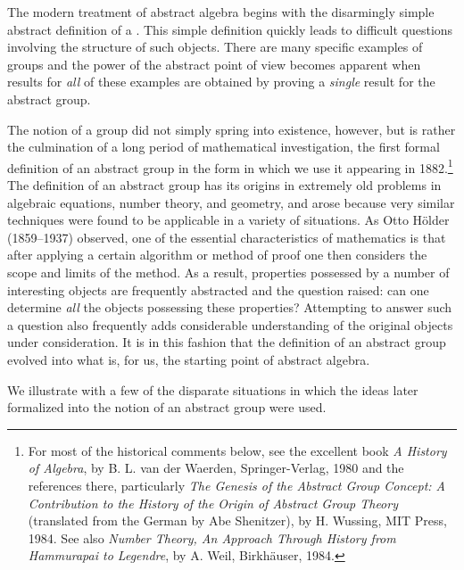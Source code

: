 
\startpart
  [
    title=Group Theory,
    reference=part:01,
  ]

  The modern treatment of abstract algebra begins with the disarmingly simple abstract definition of a . This simple definition quickly leads to difficult questions involving the structure of such objects. There are many specific examples of groups and the power of the abstract point of view becomes apparent when results for \emph{all} of these examples are obtained by proving a \emph{single} result for the abstract group.

  The notion of a group did not simply spring into existence, however, but is rather the culmination of a long period of mathematical investigation, the first formal definition of an abstract group in the form in which we use it appearing in 1882.\footnote{For most of the historical comments below, see the excellent book \emph{A History of Algebra}, by B. L. van der Waerden, Springer-Verlag, 1980 and the references there, particularly \emph{The Genesis of the Abstract Group Concept: A Contribution to the History of the Origin of Abstract Group Theory} (translated from the German by Abe Shenitzer), by H. Wussing, MIT Press, 1984. See also \emph{Number Theory, An Approach Through History from Hammurapai to Legendre}, by A. Weil, Birkhäuser, 1984.} The definition of an abstract group has its origins in extremely old problems in algebraic equations, number theory, and geometry, and arose because very similar techniques were found to be applicable in a variety of situations. As Otto Hölder (1859--1937) observed, one of the essential characteristics of mathematics is that after applying a certain algorithm or method of proof one then considers the scope and limits of the method. As a result, properties possessed by a number of interesting objects are frequently abstracted and the question raised: can one determine \emph{all} the objects possessing these properties? Attempting to answer such a question also frequently adds considerable understanding of the original objects under consideration. It is in this fashion that the definition of an abstract group evolved into what is, for us, the starting point of abstract algebra.

  We illustrate with a few of the disparate situations in which the ideas later formalized into the notion of an abstract group were used.

  

\stoppart

